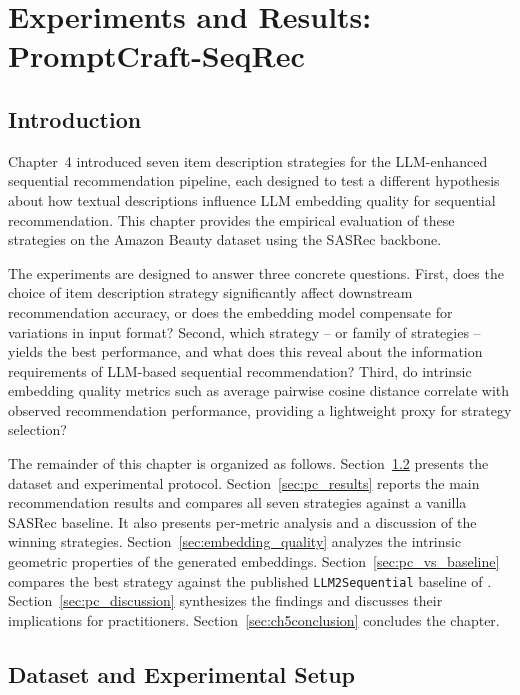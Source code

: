 \documentclass[12pt,a4paper]{report}
\begin{document}
\chapter{Experiments and Results: PromptCraft-SeqRec}

\section{Introduction}

\justifying
Chapter~4 introduced seven item description strategies for the
LLM-enhanced sequential recommendation pipeline, each designed to test a
different hypothesis about how textual descriptions influence LLM embedding
quality for sequential recommendation. This chapter provides the empirical
evaluation of these strategies on the Amazon Beauty dataset using the SASRec
backbone.

The experiments are designed to answer three concrete questions. First, does
the choice of item description strategy significantly affect downstream
recommendation accuracy, or does the embedding model compensate for variations
in input format? Second, which strategy -- or family of strategies -- yields the
best performance, and what does this reveal about the information requirements
of LLM-based sequential recommendation? Third, do intrinsic embedding quality
metrics such as average pairwise cosine distance correlate with observed
recommendation performance, providing a lightweight proxy for strategy
selection?

The remainder of this chapter is organized as follows.
Section~\ref{sec:datasets_ch5} presents the dataset and experimental protocol.
Section~\ref{sec:pc_results} reports the main recommendation results and
compares all seven strategies against a vanilla SASRec baseline.
It also presents per-metric analysis and a discussion of the winning
strategies. Section~\ref{sec:embedding_quality} analyzes the intrinsic
geometric properties of the generated embeddings.
Section~\ref{sec:pc_vs_baseline} compares the best strategy against the
published \texttt{LLM2Sequential} baseline of \citep{boz2025}.
Section~\ref{sec:pc_discussion} synthesizes the findings and discusses their
implications for practitioners. Section~\ref{sec:ch5conclusion} concludes the
chapter.

\section{Dataset and Experimental Setup}
\label{sec:datasets_ch5}
\end{document}
